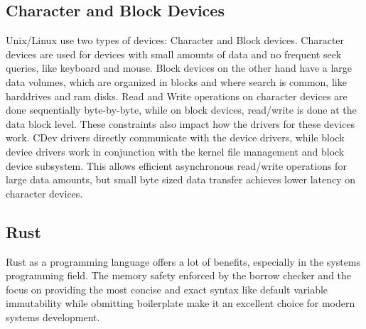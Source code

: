 \subsection{Character and Block Devices}
Unix/Linux use two types of devices: Character and Block devices. Character devices are used for devices with small amounts of data and no frequent seek queries, like keyboard and mouse. Block devices on the other hand have a large data volumes, which are organized in blocks and where search is common, like harddrives and ram disks.
Read and Write operations on character devices are done sequentially byte-by-byte, while on block devices, read/write is done at the data block level.
These constraints also impact how the drivers for these devices work. CDev drivers directly communicate with the device drivers, while block device drivers work in conjunction with the kernel file management and block device subsystem. This allows efficient asynchronous read/write operations for large data amounts, but small byte sized data transfer achieves lower latency on character devices.

\subsection{Rust}
Rust as a programming language offers a lot of benefits, especially in the systems programming field. The memory safety enforced by the borrow checker and the focus on providing the most concise and exact syntax like default variable immutability while obmitting boilerplate make it an excellent choice for modern systems development.